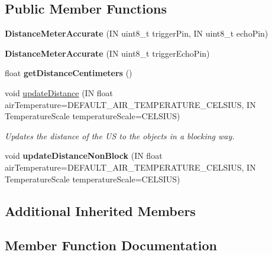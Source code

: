 \subsection*{Public Member Functions}
\begin{DoxyCompactItemize}
\item 
\mbox{\label{class_easyuino_1_1_distance_meter_accurate_a57f810d7e6653028bc23139e703985d7}} 
{\bfseries Distance\+Meter\+Accurate} (IN uint8\+\_\+t trigger\+Pin, IN uint8\+\_\+t echo\+Pin)
\item 
\mbox{\label{class_easyuino_1_1_distance_meter_accurate_a6e58a043f9d28dd6c7e4c5b819607341}} 
{\bfseries Distance\+Meter\+Accurate} (IN uint8\+\_\+t trigger\+Echo\+Pin)
\item 
\mbox{\label{class_easyuino_1_1_distance_meter_accurate_a4de44a347db0bebbf5d74f12397cd4d9}} 
float {\bfseries get\+Distance\+Centimeters} ()
\item 
void \hyperlink{class_easyuino_1_1_distance_meter_accurate_af7c43ebaa1ae75db2f806dc7039c8a82}{update\+Distance} (IN float air\+Temperature=D\+E\+F\+A\+U\+L\+T\+\_\+\+A\+I\+R\+\_\+\+T\+E\+M\+P\+E\+R\+A\+T\+U\+R\+E\+\_\+\+C\+E\+L\+S\+I\+US, IN Temperature\+Scale temperature\+Scale=C\+E\+L\+S\+I\+US)
\begin{DoxyCompactList}\small\item\em Updates the distance of the US to the objects in a blocking way. \end{DoxyCompactList}\item 
\mbox{\label{class_easyuino_1_1_distance_meter_accurate_ac428b0dfd816862fab277b2da1f0c164}} 
void {\bfseries update\+Distance\+Non\+Block} (IN float air\+Temperature=D\+E\+F\+A\+U\+L\+T\+\_\+\+A\+I\+R\+\_\+\+T\+E\+M\+P\+E\+R\+A\+T\+U\+R\+E\+\_\+\+C\+E\+L\+S\+I\+US, IN Temperature\+Scale temperature\+Scale=C\+E\+L\+S\+I\+US)
\end{DoxyCompactItemize}
\subsection*{Additional Inherited Members}


\subsection{Member Function Documentation}
\mbox{\label{class_easyuino_1_1_distance_meter_accurate_af7c43ebaa1ae75db2f806dc7039c8a82}} 
